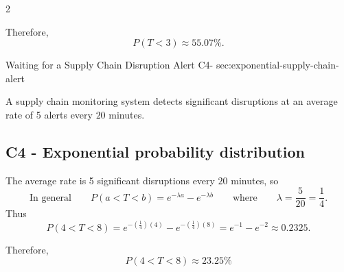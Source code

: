 \begin{multicols}{2}
{			Therefore,
			\[
			\boxed{P(T<3)\approx55.07\%}.
			\]
			
			\vspace{-5mm}
		}
			
	\end{multicols}
	
	\sectionScored
	{Waiting for a Supply Chain Disruption Alert}
	{C4-}
	{sec:exponential-supply-chain-alert}
	{
		A supply chain monitoring system detects significant disruptions at an
		average rate of 5 alerts every \(20\) minutes.
		
		
		\label{subsec:exponential-supply-chain-alert-probability}
		\subsection*{C4 - Exponential probability distribution }
		
		The average rate is 5 significant disruptions every \(20\) minutes, so
		\[
		\text{In general} \qquad
		P(a<T<b)=e^{-\lambda a}-e^{-\lambda b}
		\qquad \text{where} \qquad
		\lambda=\frac{5}{20}=\frac{1}{4}.
		\]
		Thus
		\[
		P(4<T<8)
		=
		e^{-\left(\frac{1}{4}\right)(4)}
		-
		e^{-\left(\frac{1}{4}\right)(8)}
		=
		e^{-1}-e^{-2}
		\approx0.2325.
		\]
		
		Therefore,
		\[
		\boxed{P(4<T<8)\approx23.25\%}
		\]
		
		\vspace{-5mm}
	}
	
	
